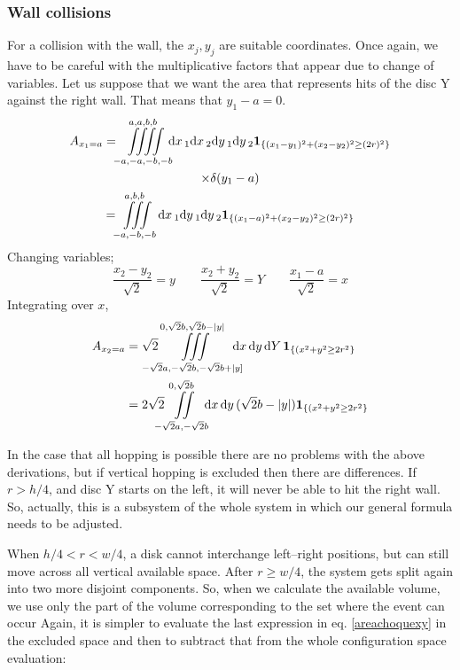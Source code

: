 \documentclass[superscriptaddress,pre,reprint,showpacs,twocolumn]{revtex4-1}
\newcommand{\rd}[1]{\mathrm{d}{#1} \,}
\newcommand{\indicatorsymbol}{\mathbf{1}}
\newcommand{\indicator}[1]{\indicatorsymbol_{ \{   #1 \} } }
\begin{document}
    \subsubsection{Wall collisions}\label{app:wall2d}

    For a collision with the wall, the $x_j, y_j$ are suitable coordinates.
    Once again, we
    have to be careful with the multiplicative factors that appear due to change
    of variables. Let us suppose that we want the area that represents hits of
    the disc Y against the right wall. That means that $y_1-a=0$. 
    \begin{multline}
      A_{x_1=a}  =\iiiint \limits_{-a,-a,-b,-b}^{a,a,b,b}
       \mkern-9mu \rd x_1 \rd x_2 \rd y_1 \rd y_2 
       \indicator{(x_1-y_1)^2+(x_2-y_2)^2 \geq (2 r)^2}
       \\ \times \delta (y_1-a)\\
      =\iiint\limits _{-a,-b,-b}^{a,b,b} \rd x_1  \rd y_1 \rd y_2 
      \indicator{(x_1-a)^2+(x_2-y_2)^2 \geq (2 r)^2} 
    \end{multline}
    Changing variables;
    \begin{equation}
      \frac{x_2-y_2}{\sqrt{2}} =  y
      \qquad \frac{x_2+y_2}{\sqrt{2}}=Y \qquad \frac{x_1-a}{\sqrt{2}}=x
    \end{equation}
    Integrating over $x$,
    \begin{align}\label{areachoquexy}
      A_{x_2=a} & =\sqrt{2} \mkern-18mu
      \iiint \limits
      _{-\sqrt{2}a,-\sqrt{2}b,-\sqrt{2}b+|y]}^{0,\sqrt{2}b,\sqrt{2}b-|y|}
        \mkern-18mu \rd x \rd y \rd Y 
        \indicator{(x^2+y^2 \geq 2 r^2}
        \\
        &=2\sqrt{2}\mkern-9mu
        \iint \limits_{-\sqrt{2}a,-\sqrt{2}b}^{0,\sqrt{2}b}
        \mkern-9mu
        \rd x \rd y (\sqrt{2} b - |y|)
      \indicator{(x^2+y^2 \geq 2 r^2}
    \end{align}
    
    
    In the case that all hopping is possible there are no problems with the above derivations,
    but if vertical hopping is excluded then there are differences.
 If $r>h/4$, and disc Y starts
    on the left, it will never be able to hit the right wall. So, actually, this
    is a subsystem of the whole  system in which our general formula needs
    to be adjusted. 

    When $h/4<r<w/4$, a disk cannot interchange left--right positions,
    but can still move across all vertical available space.  After $r\geq w/4$,
    the system gets split again into two more disjoint components.
    So, when we calculate the available volume, we use only the
    part of the volume corresponding to the set where the event can occur
    Again, it is simpler to evaluate the last expression in eq. \ref{areachoquexy}
    in the excluded space and then to subtract that from the whole configuration
    space evaluation:
\end{document}

